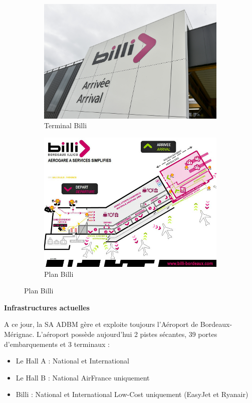 \begin{figure}[hbt!]
    \begin{subfigure}{.5\textwidth}
      \centering
      \includegraphics[width=.7\linewidth]{Images/billiext.jpg}  
      \caption{Terminal Billi}
      \label{fig:billiext}
    \end{subfigure}
    \begin{subfigure}{.5\textwidth}
      \centering
      \includegraphics[width=.7\linewidth]{Images/billi.jpg}  
      \caption{Plan Billi}
      \label{fig:planBilli}
    \end{subfigure}
    \label{fig:travaux}
\end{figure}


\textbf{Infrastructures actuelles}\newline


A ce jour, la SA ADBM gère et exploite toujours l'Aéroport de Bordeaux-Mérignac.
L'aéroport possède aujourd'hui 2 pistes sécantes, 39 portes d'embarquements et 3 terminaux :

\begin{itemize}
    \item Le Hall A : National et International
    \item Le Hall B : National AirFrance uniquement
    \item Billi : National et International Low-Cost uniquement (EasyJet et Ryanair)
\end{itemize}

